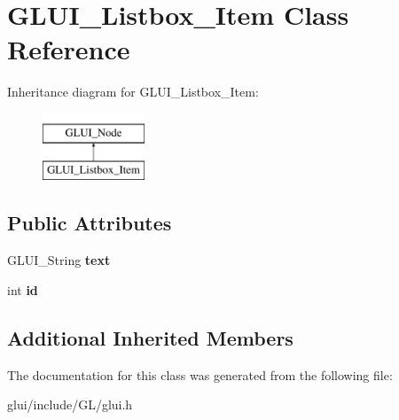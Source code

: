 \hypertarget{classGLUI__Listbox__Item}{\section{G\-L\-U\-I\-\_\-\-Listbox\-\_\-\-Item Class Reference}
\label{classGLUI__Listbox__Item}
}
Inheritance diagram for G\-L\-U\-I\-\_\-\-Listbox\-\_\-\-Item\-:\begin{figure}[H]
\begin{center}
\leavevmode
\includegraphics[height=2.000000cm]{classGLUI__Listbox__Item}
\end{center}
\end{figure}
\subsection*{Public Attributes}
\begin{DoxyCompactItemize}
\item 
\hypertarget{classGLUI__Listbox__Item_a93ab7eacdaf81a43b07b89e60bc5edbe}{G\-L\-U\-I\-\_\-\-String {\bfseries text}}\label{classGLUI__Listbox__Item_a93ab7eacdaf81a43b07b89e60bc5edbe}

\item 
\hypertarget{classGLUI__Listbox__Item_a82c3decf8704010c91232ad6e2ea95d9}{int {\bfseries id}}\label{classGLUI__Listbox__Item_a82c3decf8704010c91232ad6e2ea95d9}

\end{DoxyCompactItemize}
\subsection*{Additional Inherited Members}


The documentation for this class was generated from the following file\-:\begin{DoxyCompactItemize}
\item 
glui/include/\-G\-L/glui.\-h\end{DoxyCompactItemize}
